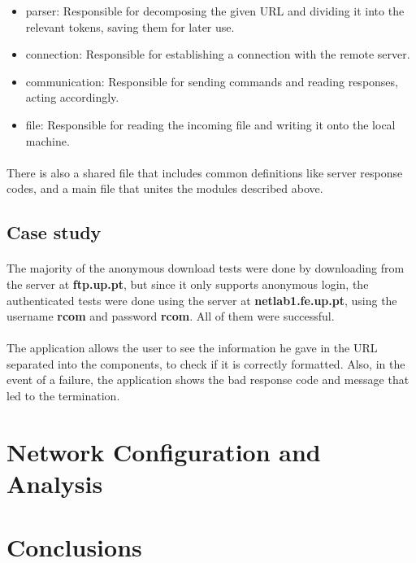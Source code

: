 \documentclass[11pt]{article}
\begin{document}
\begin{itemize}
    \item{parser: Responsible for decomposing the given URL and dividing it into the relevant tokens, saving them for later use.}
    \item{connection: Responsible for establishing a connection with the remote server.}
    \item{communication: Responsible for sending commands and reading responses, acting accordingly.}
    \item{file: Responsible for reading the incoming file and writing it onto the local machine.}
\end{itemize}

\paragraph{}There is also a shared file that includes common definitions like server response codes, and a main file that unites the modules described above.

\subsection*{Case study}

\paragraph{}The majority of the anonymous download tests were done by downloading from the server at \textbf{ftp.up.pt}, but since it only supports anonymous login, the authenticated tests were done using the server at \textbf{netlab1.fe.up.pt}, using the username \textbf{rcom} and password \textbf{rcom}. All of them were successful.

\paragraph{}The application allows the user to see the information he gave in the URL separated into the components, to check if it is correctly formatted. Also, in the event of a failure, the application shows the bad response code and message that led to the termination.

\section*{Network Configuration and Analysis}

\section*{Conclusions}
\end{document}
